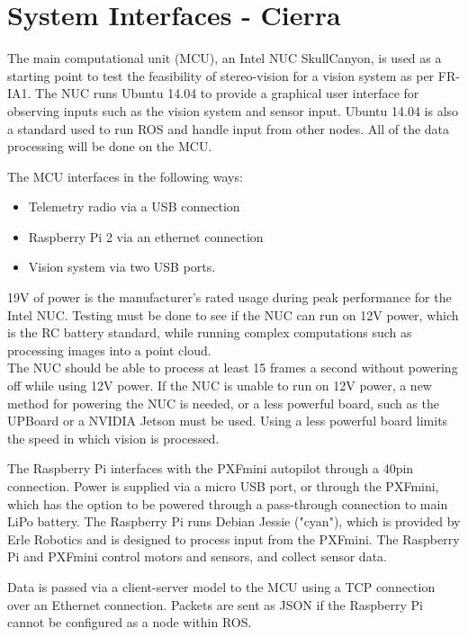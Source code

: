 \documentclass[compsoc,draftclsnofoot,onecolumn,10pt]{IEEEtran}
\begin{document}
\section{System Interfaces - Cierra}
The main computational unit (MCU), an Intel NUC SkullCanyon, is used as a starting point to test the feasibility of stereo-vision for a vision system as per FR-IA1. The NUC runs Ubuntu 14.04 to provide a graphical user interface for observing inputs such as the vision system and sensor input. Ubuntu 14.04 is also a standard used to run ROS and handle input from other nodes. 
All of the data processing will be done on the MCU. \par
The MCU interfaces in the following ways:
\begin{itemize}
\item Telemetry radio via a USB connection
\item Raspberry Pi 2 via an ethernet connection
\item Vision system via two USB ports. 
\end{itemize}
19V of power is the manufacturer's rated usage during peak performance for the Intel NUC. Testing must be done to see if the NUC can run on 12V power, which is the RC battery standard, while running complex computations such as processing images into a point cloud. \\
The NUC should be able to process at least 15 frames a second without powering off while using 12V power. 
If the NUC is unable to run on 12V power, a new method for powering the NUC is needed, or a less powerful board, such as the UPBoard or a NVIDIA Jetson must be used. Using a less powerful board limits the speed in which vision is processed.  \par

The Raspberry Pi interfaces with the PXFmini autopilot through a 40pin connection. Power is supplied via a micro USB port, or through the PXFmini, which has the option to be powered through a pass-through connection to main LiPo battery. The Raspberry Pi runs Debian Jessie ("cyan"), which is provided by Erle Robotics and is designed to process input from the PXFmini. The Raspberry Pi and PXFmini control motors and sensors, and collect sensor data. \par

Data is passed via a client-server model to the MCU using a TCP connection over an Ethernet connection. Packets are sent as JSON if the Raspberry Pi cannot be configured as a node within ROS. \par
\end{document}
